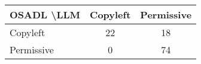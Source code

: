 \begin{tabular}{l|cc}\hline
	\textbf{OSADL \textbackslash LLM} & Copyleft & Permissive\\\hline
	Copyleft & 22 & 18\\
	Permissive & 0 & 74\\\hline
\end{tabular}
